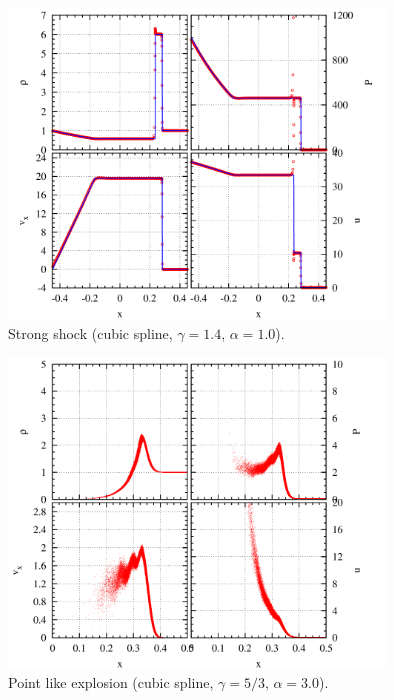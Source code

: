 \documentclass[fleqn,dvipdfmx]{article}
\begin{document}
\begin{figure}
  \begin{center}
    \includegraphics[width=10cm,bb=0 0 1020 840]{fig/strong/draw.png}
  \end{center}
  \caption{Strong shock (cubic spline, $\gamma=1.4$, $\alpha=1.0$).}
\end{figure}

\begin{figure}
  \begin{center}
    \includegraphics[width=10cm,bb=0 0 1020 840]{fig/pex/draw.png}
  \end{center}
  \caption{Point like explosion (cubic spline, $\gamma=5/3$,
    $\alpha=3.0$).}
\end{figure}
\end{document}
